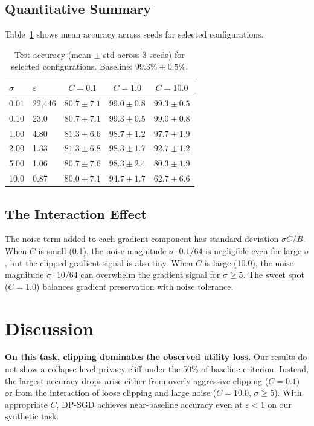 \documentclass[11pt,a4paper]{article}
\begin{document}
\subsection{Quantitative Summary}

Table~\ref{tab:results} shows mean accuracy across seeds for selected
configurations.

\begin{table}[h]
\centering
\caption{Test accuracy (mean $\pm$ std across 3 seeds) for selected
configurations. Baseline: $99.3\% \pm 0.5\%$.}
\label{tab:results}
\begin{tabular}{@{}llccc@{}}
\toprule
$\sigma$ & $\varepsilon$ & $C = 0.1$ & $C = 1.0$ & $C = 10.0$ \\
\midrule
0.01  & 22{,}446 & $80.7 \pm 7.1$ & $99.0 \pm 0.8$ & $99.3 \pm 0.5$ \\
0.10  & 23.0     & $80.7 \pm 7.1$ & $99.3 \pm 0.5$ & $99.0 \pm 0.8$ \\
1.00  & 4.80     & $81.3 \pm 6.6$ & $98.7 \pm 1.2$ & $97.7 \pm 1.9$ \\
2.00  & 1.33     & $81.3 \pm 6.8$ & $98.3 \pm 1.7$ & $92.7 \pm 1.2$ \\
5.00  & 1.06     & $80.7 \pm 7.6$ & $98.3 \pm 2.4$ & $80.3 \pm 1.9$ \\
10.0  & 0.87     & $80.0 \pm 7.1$ & $94.7 \pm 1.7$ & $62.7 \pm 6.6$ \\
\bottomrule
\end{tabular}
\end{table}

\subsection{The Interaction Effect}

The noise term added to each gradient component has standard deviation
$\sigma C / B$. When $C$ is small (0.1), the noise magnitude $\sigma \cdot
0.1 / 64$ is negligible even for large $\sigma$, but the clipped gradient
signal is also tiny. When $C$ is large (10.0), the noise magnitude
$\sigma \cdot 10 / 64$ can overwhelm the gradient signal for $\sigma \geq 5$.
The sweet spot ($C = 1.0$) balances gradient preservation with noise tolerance.

\section{Discussion}

\textbf{On this task, clipping dominates the observed utility loss.} Our
results do not show a collapse-level privacy cliff under the 50\%-of-baseline
criterion. Instead, the largest accuracy drops arise either from overly
aggressive clipping ($C=0.1$) or from the interaction of loose clipping and
large noise ($C=10.0$, $\sigma \geq 5$). With appropriate $C$, DP-SGD
achieves near-baseline accuracy even at $\varepsilon < 1$ on our synthetic
task.
\end{document}
